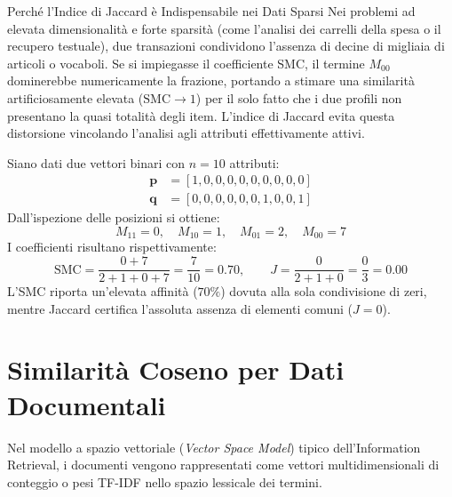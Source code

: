 \begin{noteblock}{Perché l'Indice di Jaccard è Indispensabile nei Dati Sparsi}
Nei problemi ad elevata dimensionalità e forte sparsità (come l'analisi dei carrelli della spesa o il recupero testuale), due transazioni condividono l'assenza di decine di migliaia di articoli o vocaboli. Se si impiegasse il coefficiente SMC, il termine $M_{00}$ dominerebbe numericamente la frazione, portando a stimare una similarità artificiosamente elevata ($\text{SMC} \to 1$) per il solo fatto che i due profili non presentano la quasi totalità degli item. L'indice di Jaccard evita questa distorsione vincolando l'analisi agli attributi effettivamente attivi.
\end{noteblock}

\begin{example}
Siano dati due vettori binari con $n = 10$ attributi:
\begin{align}
    \mathbf{p} &= [1, 0, 0, 0, 0, 0, 0, 0, 0, 0] \\
    \mathbf{q} &= [0, 0, 0, 0, 0, 0, 1, 0, 0, 1]
\end{align}
Dall'ispezione delle posizioni si ottiene:
\begin{equation}
    M_{11} = 0, \quad M_{10} = 1, \quad M_{01} = 2, \quad M_{00} = 7
\end{equation}
I coefficienti risultano rispettivamente:
\begin{equation}
    \text{SMC} = \frac{0 + 7}{2 + 1 + 0 + 7} = \frac{7}{10} = 0.70, \qquad
    J = \frac{0}{2 + 1 + 0} = \frac{0}{3} = 0.00
\end{equation}
L'SMC riporta un'elevata affinità ($70\%$) dovuta alla sola condivisione di zeri, mentre Jaccard certifica l'assoluta assenza di elementi comuni ($J = 0$).
\end{example}

\section{Similarità Coseno per Dati Documentali}
\label{sec:dm-cosine-similarity}

Nel modello a spazio vettoriale (\textit{Vector Space Model}) tipico dell'Information Retrieval, i documenti vengono rappresentati come vettori multidimensionali di conteggio o pesi TF-IDF nello spazio lessicale dei termini.

